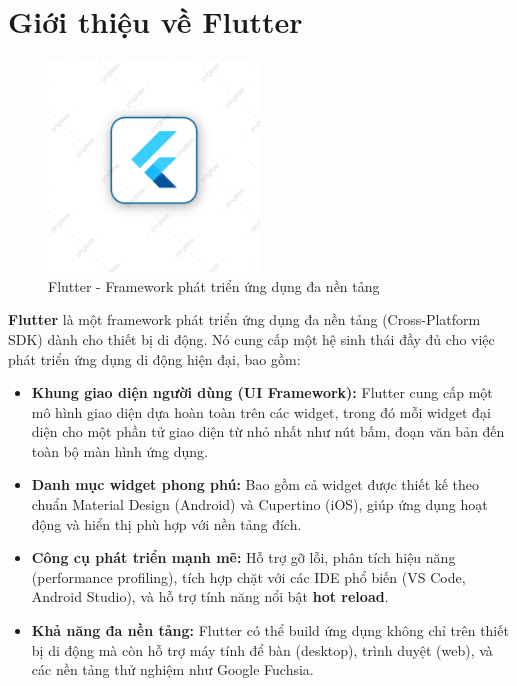 \documentclass[../DoAn.tex]{subfiles}
\numberwithin{figure}{chapter}
\begin{document}
\section{Giới thiệu về Flutter}
\begin{figure}[H]
    \centering
    \includegraphics[width=0.5\textwidth]{Hinhve/flutterimg.png}
    \caption{Flutter - Framework phát triển ứng dụng đa nền tảng}
    \label{fig:flutterimg}
\end{figure}

\textbf{Flutter} là một framework phát triển ứng dụng đa nền
tảng (Cross-Platform SDK) dành cho thiết bị di động. Nó cung cấp một hệ sinh thái đầy đủ cho việc phát triển ứng dụng di động hiện đại, bao gồm:
\begin{itemize}
    \item \textbf{Khung giao diện người dùng (UI Framework):} Flutter cung cấp một mô hình giao diện dựa hoàn toàn trên các widget, trong đó mỗi widget đại diện cho một phần tử giao diện từ nhỏ nhất như nút bấm, đoạn văn bản đến toàn bộ màn hình ứng dụng.
    \item \textbf{Danh mục widget phong phú:} Bao gồm cả widget được thiết kế theo chuẩn Material Design (Android) và Cupertino (iOS), giúp ứng dụng hoạt động và hiển thị phù hợp với nền tảng đích.
    \item \textbf{Công cụ phát triển mạnh mẽ:} Hỗ trợ gỡ lỗi, phân tích hiệu năng (performance profiling), tích hợp chặt với các IDE phổ biến (VS Code, Android Studio), và hỗ trợ tính năng nổi bật \textbf{hot reload}.
    \item \textbf{Khả năng đa nền tảng:} Flutter có thể build ứng dụng không chỉ trên thiết bị di động mà còn hỗ trợ máy tính để bàn (desktop), trình duyệt (web), và các nền tảng thử nghiệm như Google Fuchsia.
\end{itemize}
\end{document}
